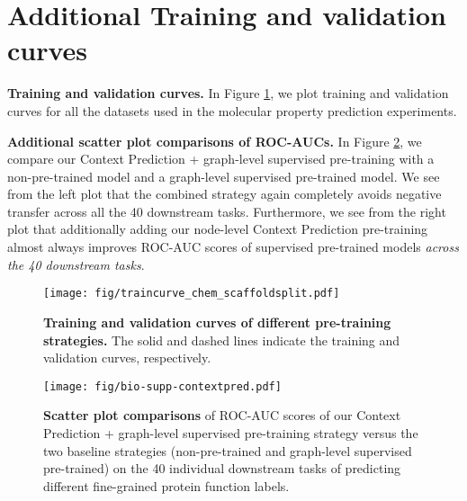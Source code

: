 \documentclass{article} \usepackage{iclr2020_conference,times}
\numberwithin{equation}{section}
\theoremstyle{plain}
\theoremstyle{definition}
\theoremstyle{remark}
\begin{document}
\section{Additional Training and validation curves}
\label{app:additonal_results}
{\bf Training and validation curves.}
In Figure \ref{fig:chem-curve-scaffold}, we plot training and validation curves for all the datasets used in the molecular property prediction experiments.

{\bf Additional scatter plot comparisons of ROC-AUCs.}
In Figure \ref{fig:scatter-additional}, we compare our Context Prediction + graph-level supervised pre-training with a non-pre-trained model and a graph-level supervised pre-trained model. We see from the left plot that the combined strategy again completely avoids negative transfer across all the 40 downstream tasks. Furthermore, we see from the right plot that additionally adding our node-level Context Prediction pre-training almost always improves ROC-AUC scores of supervised pre-trained models \emph{across the 40 downstream tasks}.


\label{app:training_curves}
\begin{figure}[t]
\texttt{[image: fig/traincurve\_chem\_scaffoldsplit.pdf]}
\caption{{\bf Training and validation curves of different pre-training strategies.} The solid and dashed lines indicate the training and validation curves, respectively.}
\label{fig:chem-curve-scaffold}
\end{figure}

\begin{figure}[t]
\texttt{[image: fig/bio-supp-contextpred.pdf]}
\caption{
{\bf Scatter plot comparisons} of ROC-AUC scores of our Context Prediction + graph-level supervised pre-training strategy versus the two baseline strategies (non-pre-trained and graph-level supervised pre-trained) on the 40 individual downstream tasks of predicting different fine-grained protein function labels.
}
\label{fig:scatter-additional}
\end{figure} 
\end{document}
